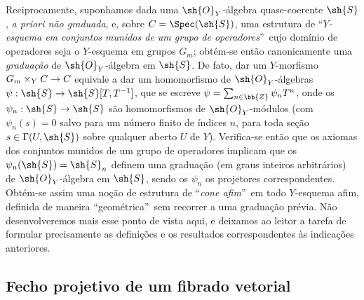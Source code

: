 \documentclass[oneside,10pt]{amsart}
\makeatletter
\newcommand{\ega@arrow}[2]{\mathchoice{#1}{#2}{#2}{#2}}
\renewcommand{\to}{\ega@arrow{\longrightarrow}{\rightarrow}}
\newcommand{\oldpage}[2][]{\marginnote{\normalfont\footnotesize\textbf{#1}~|~#2}\ignorespaces}
\let\EGAOriginalLabel\label
\renewcommand{\label}[1]{\phantomsection\EGAOriginalLabel{#1}}
\makeatother
\begin{document}
\begin{remark}[8.3.9]
Reciprocamente, suponhamos dada uma $\sh{O}_Y$-álgebra quase-coerente $\sh{S}$, \emph{a priori não graduada}, e, sobre $C=\Spec(\sh{S})$, uma estrutura de \textquotedblleft\emph{$Y$-esquema em conjuntos munidos de um grupo de operadores}\textquotedblright\ cujo domínio de operadores seja o $Y$-esquema em grupos $G_m$;
obtém-se então canonicamente uma \emph{graduação} de $\sh{O}_Y$-álgebra em $\sh{S}$.
De fato, dar um $Y$-morfismo $G_m\times_Y C\to C$ equivale a dar um homomorfismo de $\sh{O}_Y$-álgebras $\psi:\sh{S}\to\sh{S}[T,T^{-1}]$, que se escreve $\psi=\sum_{n\in\bb{Z}}\psi_n T^n$, onde os $\psi_n:\sh{S}\to\sh{S}$ são homomorfismos de $\sh{O}_Y$-módulos (com $\psi_n(s)=0$ salvo para um número finito de índices $n$, para toda seção $s\in\Gamma(U,\sh{S})$ sobre qualquer aberto $U$ de $Y$).
Verifica-se então que os axiomas dos conjuntos munidos de um grupo de operadores implicam que os $\psi_n(\sh{S})=\sh{S}_n$ definem uma graduação (em graus inteiros arbitrários) de $\sh{O}_Y$-álgebra em $\sh{S}$, sendo os $\psi_n$ os projetores correspondentes.
Obtém-se assim uma noção de estrutura de \textquotedblleft\emph{cone afim}\textquotedblright\ em todo $Y$-esquema afim, definida de maneira \textquotedblleft geométrica\textquotedblright\ sem recorrer a uma graduação prévia.
\oldpage[II]{168}
Não desenvolveremos mais esse ponto de vista aqui, e deixamos ao leitor a tarefa de formular precisamente as definições e os resultados correspondentes às indicações anteriores.
\end{remark}
\subsection{Fecho projetivo de um fibrado vetorial}
\label{subsection:II.8.4}
\end{document}
